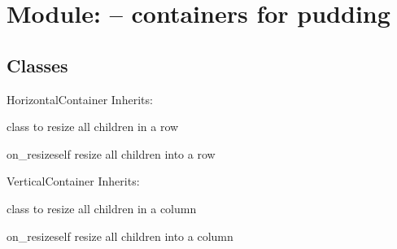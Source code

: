 \section{Module:  -- containers for pudding}
\subsection{Classes}
\begin{classdesc*}{HorizontalContainer}
Inherits:

class to resize all children in a row

\begin{methoddesc}{on_resize}{self}
resize all children into a row
\end{methoddesc}

\end{classdesc*}

\begin{classdesc*}{VerticalContainer}
Inherits:

class to resize all children in a column

\begin{methoddesc}{on_resize}{self}
resize all children into a column
\end{methoddesc}

\end{classdesc*}

